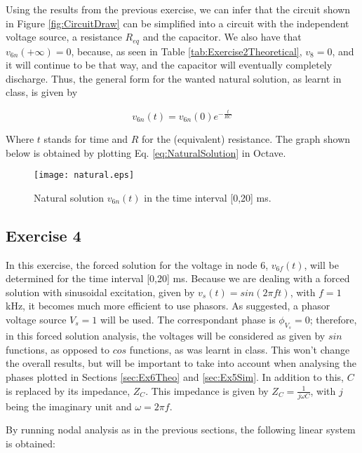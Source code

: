 Using the results from the previous exercise, we can infer that the circuit shown in Figure \ref{fig:CircuitDraw} can be simplified into a circuit with the independent voltage source, a resistance $R_{eq}$ and the capacitor. We also have that $v_{6n}(+\infty)=0$, because, as seen in Table \ref{tab:Exercise2Theoretical}, $v_8=0$, and it will continue to be that way, and the capacitor will eventually completely discharge. Thus, the general form for the wanted natural solution, as learnt in class, is given by

\begin{equation} \label{eq:NaturalSolution}
  v_{6n}(t)=v_{6n}(0)e^{-\frac{t}{RC}}
\end{equation}

Where $t$ stands for time and $R$ for the (equivalent) resistance. The graph shown below is obtained by plotting Eq. \ref{eq:NaturalSolution} in Octave.

\begin{figure}[H]
  \centering
  \texttt{[image: natural.eps]}
  \caption{Natural solution $v_{6n}(t)$ in the time interval [0,20] ms.}
  \label{fig:NaturalSolutionGraph}
\end{figure}


\subsection{Exercise 4} \label{sec:Ex4Theo}

In this exercise, the forced solution for the voltage in node 6, $v_{6f}(t)$, will be determined for the time interval [0,20] ms. Because we are dealing with a forced solution with sinusoidal excitation, given by $v_s(t)=sin(2\pi ft)$, with $f=1$kHz, it becomes much more efficient to use phasors. As suggested, a phasor voltage source $V_s=1$ will be used. The correspondant phase is $\phi_{V_s}=0$; therefore, in this forced solution analysis, the voltages will be considered as given by $sin$ functions, as opposed to $cos$ functions, as was learnt in class. This won't change the overall results, but will be important to take into account when analysing the phases plotted in Sections \ref{sec:Ex6Theo} and \ref{sec:Ex5Sim}. In addition to this, $C$ is replaced by its impedance, $Z_C$. This impedance is given by $Z_C=\frac{1}{j\omega C}$, with $j$ being the imaginary unit and $\omega=2\pi f$.
\par
By running nodal analysis as in the previous sections, the following linear system is obtained: 

